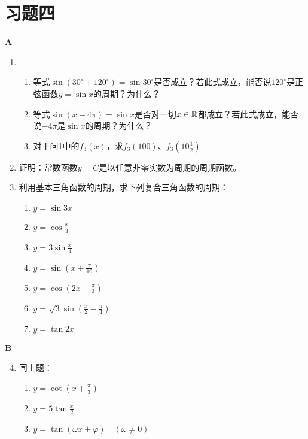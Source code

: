 \section*{习题四}
\begin{center}
    \bfseries A
\end{center}

\begin{enumerate}
    \item \begin{enumerate}[(1)]
        \item 等式$\sin(30^{\circ}+120^{\circ})=\sin30^{\circ}$是否成立？若此式成立，能否说$120^{\circ}$是正弦函数$y=\sin x$的周期？为什么？
        \item 等式$\sin(x-4\pi)=\sin x$是否对一切$x\in\mathbb{R}$都成立？若此式成立，能否说$-4\pi$是$\sin x$的周期？为什么？
        \item 对于问1中的$f_3(x)$，求$f_3(100)$、$f_3\left(10\frac{1}{2}\right)$.
    \end{enumerate}
    \item 证明：常数函数$y=C$是以任意非零实数为周期的周期函数。
    \item 利用基本三角函数的周期，求下列复合三角函数的周期：
\begin{multicols}{2}
\begin{enumerate}[(1)]
    \item $y= \sin 3x$
    \item $y= \cos\frac{x}{3}$
    \item $y= 3\sin\frac{x}{4}$
    \item $y= \sin\left(x+\frac{\pi}{10}\right)$
    \item $y= \cos\left(2x+\frac{\pi}{3}\right)$
    \item $y= \sqrt{3}\sin\left(\frac{x}{2}-\frac{\pi}{4}\right)$
    \item $y= \tan 2x$
\end{enumerate}
\end{multicols}
\end{enumerate}

\begin{center}
    \bfseries B
\end{center}

\begin{enumerate}\setcounter{enumi}{3}
    \item 同上题：
\begin{multicols}{2}
\begin{enumerate}[(1)]
    \item $y=\cot\left(x+\frac{\pi}{3}\right)$
    \item $y=5\tan\frac{x}{2}$
    \item $y=\tan(\omega x+\varphi)\quad (\omega\ne 0)$
\end{enumerate}
\end{multicols}
\end{enumerate}

